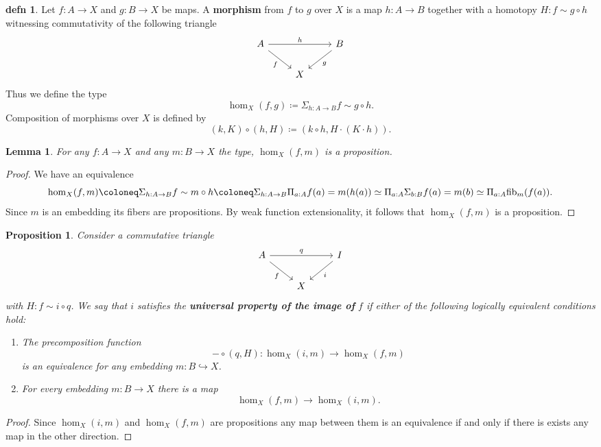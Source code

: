 \documentclass{amsart}
\theoremstyle{theorem}
\newtheorem*{lem}{Lemma}
\newtheorem*{prop}{Proposition}
\theoremstyle{definition}
\newtheorem*{defn}{defn}
\theoremstyle{remark}
\newcommand{\0}{\mathbbe{0}}
\newcommand{\1}{\mathbbe{1}}
\newcommand{\2}{\mathbbe{2}}
\newcommand{\3}{\mathbbe{3}}
\newcommand{\4}{\mathbbe{4}}
\newcommand{\type}[1]{{\textup{#1}}}
\newcommand{\fib}{\type{fib}}
\begin{document}
\begin{defn} Let $f \colon A \to X$ and $g  \colon B \to X$ be maps. A \textbf{morphism} from $f$ to $g$ over $X$ is a map $h \colon A \to B$ together with a homotopy $H \colon f \sim g \circ h$ witnessing commutativity of the following triangle
\[
\begin{tikzcd} A \arrow[rr, "h"] \arrow[dr, "f"'] & & B \arrow[dl, "g"] \\ & X
\end{tikzcd}
\]
Thus we define the type
\[ \hom_X(f,g) \coloneq \Sigma_{h:A \to B} f \sim g \circ h.\]
Composition of morphisms over $X$ is defined by
\[ (k,K) \circ (h,H) \coloneq (k \circ h, H \cdot (K \cdot h)).\]
\end{defn}


\begin{lem} For any $f \colon A \to X$ and any $m : B \to X$ the type, $\hom_X(f,m)$ is a proposition.
\end{lem} 
\begin{proof}
We have an equivalence
\[ \hom_X(f,m) \coloneq  \Sigma_{h:A \to B} f \sim m \circ h \coloneq \Sigma_{h:A \to B} \Pi_{a :A}  f(a) = m(h(a)) \simeq \Pi_{a:A} \Sigma_{b :B} f(a) = m(b) \simeq  \Pi_{a:A} \fib_m(f(a)).\]
Since $m$ is an embedding its fibers are propositions. By weak function extensionality, it follows that $\hom_X(f,m)$ is a proposition.
\end{proof}


\begin{prop}
Consider a commutative triangle 
\[
\begin{tikzcd} A \arrow[rr, "q"] \arrow[dr, "f"'] & & I \arrow[dl, "i"] \\ & X
\end{tikzcd}
\]
with $H : f \sim i \circ q$. 
We say that $i$ satisfies the \textbf{universal property of the image of} $f$ if either of the following logically equivalent conditions hold:
\begin{enumerate}
\item The precomposition function 
\[ - \circ (q,H) : \hom_X(i,m) \to \hom_X(f,m)\]
is an equivalence for any embedding $m \colon B \hookrightarrow X$.
\item For every embedding $m : B \to X$ there is a map
\[ \hom_X(f,m) \to \hom_X(i,m).\]
\end{enumerate}
\end{prop}
\begin{proof}
Since $\hom_X(i,m)$ and $\hom_X(f,m)$ are propositions any map between them is an equivalence if and only if there is exists any map in the other direction.
\end{proof}
\end{document}
